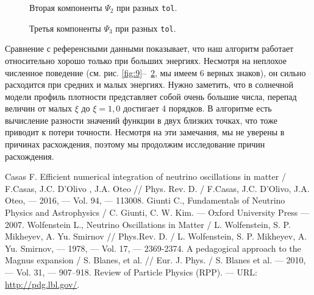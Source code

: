 \documentclass[12pt]{article}
\begin{document}
\begin{figure}[htb]
  \hspace*{-2em}
  \caption{\label{fig:10}Вторая компоненты \(\Psi_{2}\) при разных \texttt{tol}.}
\end{figure}

\begin{figure}[htb]
  \hspace*{-2em}
  \caption{\label{fig:11}Третья компоненты \(\Psi_{3}\) при разных \texttt{tol}.}
\end{figure}

Сравнение с референсными данными показывает, что наш алгоритм работает
относительно хорошо только при больших энергиях. Несмотря на неплохое численное
поведение (см. рис. \ref{fig:9}–~\ref{fig:11}, мы имеем 6 верных знаков), он
сильно расходится при средних и малых энергиях. Нужно заметить, что в солнечной
модели профиль плотности представляет собой очень большие числа, перепад величин
от малых \(\xi\) до \(\xi=1{,}0\) достигает 4 порядков. В алгоритме есть
вычисление разности значений функции в двух близких точках, что тоже приводит к
потери точности. Несмотря на эти замечания, мы не уверены в причинах
расхождения, поэтому мы продолжим исследование причин расхождения.

\newpage
{}
\begin{thebibliography}{99}
 Casas F. Efficient numerical
  integration of neutrino oscillations in matter / F.Casas, J.C. D'Olivo , J.A. Oteo // Phys. Rev. D. / F.Casas, J.C. D'Olivo, J.A. Oteo, — 2016, —
  Vol. 94, — 113008.
 Giunti C., Fundamentals of Neutrino Physics and Astrophysics / C. 
  Giunti, C. W. Kim. –– Oxford University Press –– 2007.
 Wolfenstein L., Neutrino Oscillations in Matter / L. Wolfenstein, S. 
 P. Mikheyev, A. Yu. Smirnov // Phys.Rev. D. / L. Wolfenstein, S. P. Mikheyev, A. Yu. Smirnov, — 1978, — Vol. 17, — 2369-2374.
 A pedagogical approach to the Magnus expansion / 
 S. Blanes, et al. // Eur. J. Phys. / S. Blanes et al. — 2010, — Vol. 31, — 907–918.
 \label{pdg} Review of Particle Physics (RPP). — URL: 
 \href{http://pdg.lbl.gov/}{http://pdg.lbl.gov/}.
\end{thebibliography}
\end{document}
